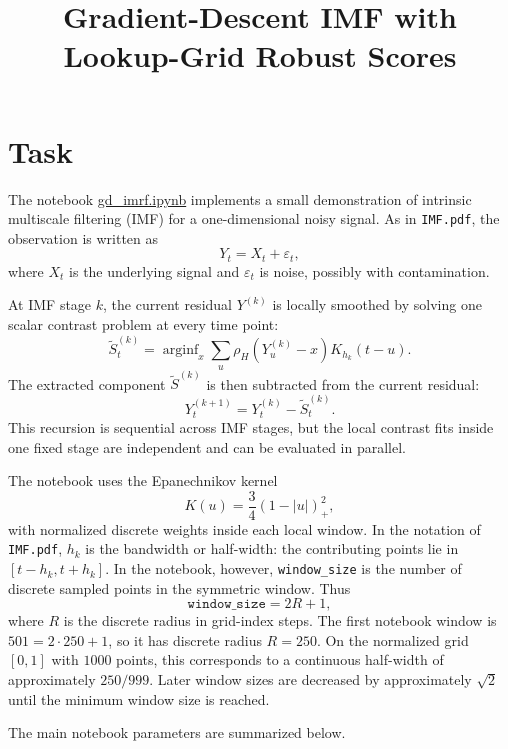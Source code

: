\documentclass[11pt]{article}
\title{Gradient-Descent IMF with Lookup-Grid Robust Scores}
\author{}
\date{}
\begin{document}
\maketitle

\section{Task}

The notebook \href{https://github.com/mkuziuk/imf/blob/main/gd_imrf.ipynb}{gd\_imrf.ipynb}
implements a small demonstration of intrinsic multiscale filtering (IMF) for a
one-dimensional noisy signal. As in \texttt{IMF.pdf}, the observation is written as
\[
Y_t = X_t + \varepsilon_t,
\]
where \(X_t\) is the underlying signal and \(\varepsilon_t\) is noise, possibly with
contamination.

At IMF stage \(k\), the current residual \(Y^{(k)}\) is locally smoothed by solving
one scalar contrast problem at every time point:
\[
\widetilde S_t^{(k)}
= \operatorname{arginf}_x
\sum_u \rho_H\left(Y_u^{(k)} - x\right)K_{h_k}(t-u).
\]
The extracted component \(\widetilde S^{(k)}\) is then subtracted from the current
residual:
\[
Y_t^{(k+1)} = Y_t^{(k)} - \widetilde S_t^{(k)}.
\]
This recursion is sequential across IMF stages, but the local contrast fits inside one
fixed stage are independent and can be evaluated in parallel.

The notebook uses the Epanechnikov kernel
\[
K(u) = \frac{3}{4}(1 - |u|)^2_+,
\]
with normalized discrete weights inside each local window. In the notation of
\texttt{IMF.pdf}, \(h_k\) is the bandwidth or half-width: the contributing points
lie in \([t-h_k,t+h_k]\). In the notebook, however, \texttt{window\_size} is the
number of discrete sampled points in the symmetric window. Thus
\[
\texttt{window\_size}=2R+1,
\]
where \(R\) is the discrete radius in grid-index steps. The first notebook window is
\(501=2\cdot 250+1\), so it has discrete radius \(R=250\). On the normalized grid
\([0,1]\) with \(1000\) points, this corresponds to a continuous half-width of
approximately \(250/999\). Later window sizes are decreased by approximately
\(\sqrt{2}\) until the minimum window size is reached.

The main notebook parameters are summarized below.
\end{document}

